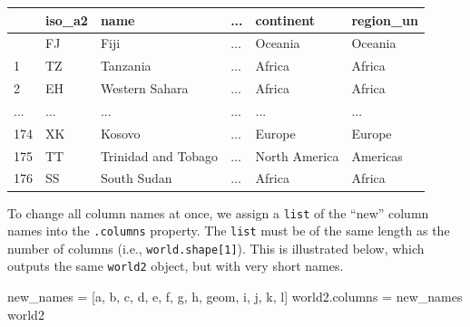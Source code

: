 \documentclass[
  letterpaper,
]{krantz}
\newenvironment{Shaded}{\begin{snugshade}}{\end{snugshade}}
\newcommand{\NormalTok}[1]{\textcolor[rgb]{0.00,0.23,0.31}{#1}}
\newcommand{\OperatorTok}[1]{\textcolor[rgb]{0.37,0.37,0.37}{#1}}
\newcommand{\StringTok}[1]{\textcolor[rgb]{0.13,0.47,0.30}{#1}}
\begin{document}
\begin{longtable}[]{@{}llllll@{}}
\toprule\noalign{}
& iso\_a2 & name & ... & continent & region\_un \\
\midrule\noalign{}
\endhead
\bottomrule\noalign{}
\endlastfoot
0 & FJ & Fiji & ... & Oceania & Oceania \\
1 & TZ & Tanzania & ... & Africa & Africa \\
2 & EH & Western Sahara & ... & Africa & Africa \\
... & ... & ... & ... & ... & ... \\
174 & XK & Kosovo & ... & Europe & Europe \\
175 & TT & Trinidad and Tobago & ... & North America & Americas \\
176 & SS & South Sudan & ... & Africa & Africa \\
\end{longtable}

To change all column names at once, we assign a \texttt{list} of the
``new'' column names into the \texttt{.columns} property. The
\texttt{list} must be of the same length as the number of columns (i.e.,
\texttt{world.shape{[}1{]}}). This is illustrated below, which outputs
the same \texttt{world2} object, but with very short names.

\begin{Shaded}
\begin{Highlighting}[]
\NormalTok{new\_names }\OperatorTok{=}\NormalTok{ [}\StringTok{\textquotesingle{}a\textquotesingle{}}\NormalTok{, }\StringTok{\textquotesingle{}b\textquotesingle{}}\NormalTok{, }\StringTok{\textquotesingle{}c\textquotesingle{}}\NormalTok{, }\StringTok{\textquotesingle{}d\textquotesingle{}}\NormalTok{, }\StringTok{\textquotesingle{}e\textquotesingle{}}\NormalTok{, }\StringTok{\textquotesingle{}f\textquotesingle{}}\NormalTok{, }\StringTok{\textquotesingle{}g\textquotesingle{}}\NormalTok{, }\StringTok{\textquotesingle{}h\textquotesingle{}}\NormalTok{, }\StringTok{\textquotesingle{}geom\textquotesingle{}}\NormalTok{, }\StringTok{\textquotesingle{}i\textquotesingle{}}\NormalTok{, }\StringTok{\textquotesingle{}j\textquotesingle{}}\NormalTok{, }\StringTok{\textquotesingle{}k\textquotesingle{}}\NormalTok{, }\StringTok{\textquotesingle{}l\textquotesingle{}}\NormalTok{]}
\NormalTok{world2.columns }\OperatorTok{=}\NormalTok{ new\_names}
\NormalTok{world2}
\end{Highlighting}
\end{Shaded}
\end{document}
